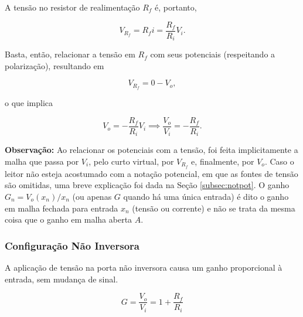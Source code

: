\documentclass{article}
\numberwithin{equation}{section}
\let\dfr\dfrac
\begin{document}
\noindent A tensão no resistor de realimentação $R_f$ é, portanto,

\begin{equation*}
    V_{R_f} = R_f i = \dfr{R_f}{R_i} V_i.
\end{equation*}

\noindent Basta, então, relacionar a tensão em $R_f$ com seus potenciais (respeitando a polarização), resultando em

\begin{equation*}
    V_{R_f} = 0 - V_o,
\end{equation*}

\noindent o que implica

\begin{equation*}
    V_o = -\dfr{R_f}{R_i} V_i \implies \dfr{V_o}{V_i} = -\dfr{R_f}{R_i}.
\end{equation*}

\textbf{Observação:} Ao relacionar os potenciais com a tensão, foi feita implicitamente a malha que passa por $V_i$, pelo curto virtual, por $V_{R_f}$ e, finalmente, por $V_o$. Caso o leitor não esteja acostumado com a notação potencial, em que as fontes de tensão são omitidas, uma breve explicação foi dada na Seção \ref{subsec:notpot}. O ganho $G_n = V_o(x_n)/x_n$ (ou apenas $G$ quando há uma única entrada) é dito o ganho em malha fechada para entrada $x_n$ (tensão ou corrente) e não se trata da mesma coisa que o ganho em malha aberta $A$.

\subsubsection{Configuração Não Inversora}
A aplicação de tensão na porta não inversora causa um ganho proporcional à entrada, sem mudança de sinal.

\begin{center}
\end{center}

\begin{equation}
    G=\frac{V_{o}}{V_{i}}=1+\frac{R_{f}}{R_{i}}
\end{equation}
\end{document}
